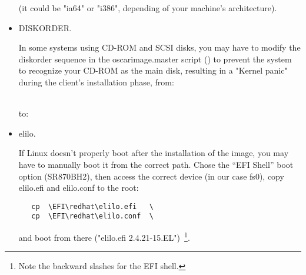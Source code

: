 \begin{itemize}

(it could be "ia64" or "i386", depending of your machine's architecture).



\item DISKORDER.

In some systems using CD-ROM and SCSI disks, you may have to modify
the diskorder sequence in the oscarimage.master script
() to prevent the system to recognize
your CD-ROM as the main disk, resulting in a "Kernel panic" during the
client's installation phase, from:  

    \ \\  %
to:  
    \ \\  %


\item elilo.

If Linux doesn't properly boot after the installation of the image,
you may have to manually boot it from the correct path.  Chose the
``EFI Shell'' boot option (SR870BH2), then access the correct device (in
our case fs0), copy elilo.efi and elilo.conf to the root: 

\begin{verbatim}
   cp  \EFI\redhat\elilo.efi   \
   cp  \EFI\redhat\elilo.conf  \ 
\end{verbatim}

and boot from there ("elilo.efi 2.4.21-15.EL")~\footnote{Note the backward
slashes for the EFI shell.}.

\end{itemize}

